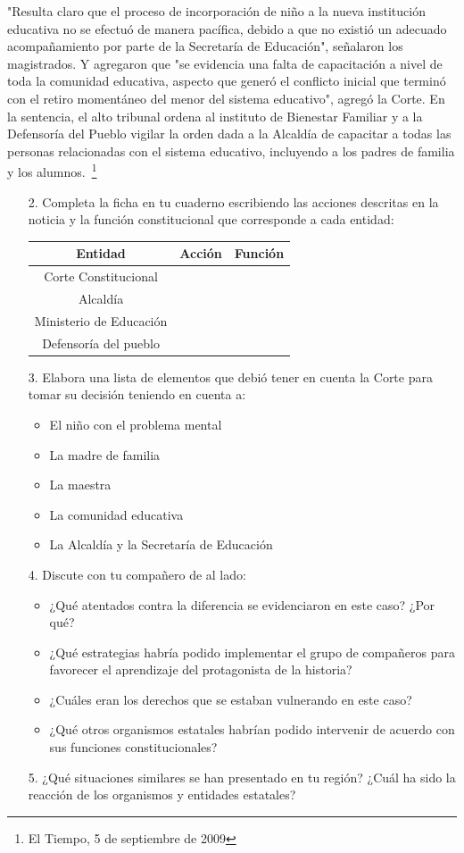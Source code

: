 \documentclass[10pt,twoside]{article}
\begin{document}
"Resulta claro que el proceso de incorporación de niño a la nueva institución educativa no se efectuó de manera pacífica, debido a que no existió un adecuado acompañamiento por parte de la Secretaría de Educación", señalaron los magistrados. Y agregaron que "se evidencia una falta de capacitación a nivel de toda la comunidad educativa, aspecto que generó el conflicto inicial que terminó con el retiro momentáneo del menor del sistema educativo", agregó la Corte. En la sentencia, el alto tribunal ordena al instituto de Bienestar Familiar y a la Defensoría del Pueblo vigilar la orden dada a la Alcaldía de capacitar a todas las personas relacionadas con el sistema educativo, incluyendo a los padres de familia y los alumnos.~\footnote{El Tiempo, 5 de septiembre de 2009}
\begin{enumerate}
\item[2.] Completa la ficha en tu cuaderno escribiendo las acciones descritas en la noticia y la función constitucional que corresponde a cada entidad:

\begin{tabular}{|c|c|c|}
\hline 
\textbf{Entidad} & \textbf{Acción} & \textbf{Función} \\ 
\hline 
Corte Constitucional &  &  \\ 
\hline 
Alcaldía &  &  \\ 
\hline 
Ministerio de Educación &  &  \\ 
\hline 
Defensoría del pueblo &  &  \\ 
\hline 
\end{tabular} 
\item[3.] Elabora una lista de elementos que debió tener en cuenta la Corte para tomar su decisión teniendo en cuenta a:
\begin{itemize}
\item El niño con el problema mental
\item La madre de familia
\item La maestra
\item La comunidad educativa
\item La Alcaldía y la Secretaría de Educación
\end{itemize}
\item[4.] Discute con tu compañero de al lado:
\begin{itemize}
\item ¿Qué atentados contra la diferencia se evidenciaron en este caso? ¿Por qué?
\item ¿Qué estrategias habría podido implementar el grupo de compañeros para favorecer el aprendizaje del protagonista de la historia?
\item ¿Cuáles eran los derechos que se estaban vulnerando en este caso?
\item ¿Qué otros organismos estatales habrían podido intervenir de acuerdo con sus funciones constitucionales?
\end{itemize}
\item[5.] ¿Qué situaciones similares se han presentado en tu región? ¿Cuál ha sido la reacción de los organismos y entidades estatales?
\end{enumerate}
\end{document}

